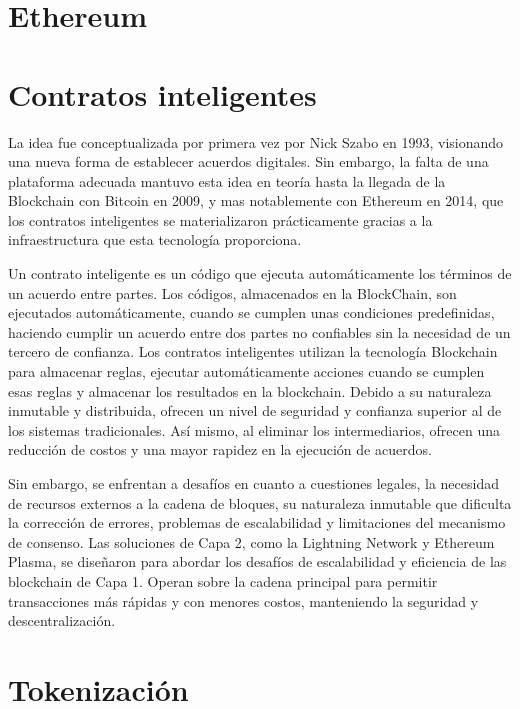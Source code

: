 \section{Ethereum}



\section{Contratos inteligentes}


La idea fue conceptualizada por primera vez por Nick Szabo en 1993, visionando una nueva forma de establecer acuerdos digitales. Sin embargo, la falta de una plataforma adecuada mantuvo esta idea en teoría hasta la llegada de la Blockchain con Bitcoin en 2009, y mas notablemente con Ethereum en 2014, que los contratos inteligentes se materializaron prácticamente gracias a la infraestructura que esta tecnología proporciona. ~\cite{smartcontractHistoria}

Un contrato inteligente es un código que ejecuta automáticamente los términos de un acuerdo entre partes. Los códigos, almacenados en la BlockChain, son ejecutados automáticamente, cuando se cumplen unas condiciones predefinidas, haciendo cumplir un acuerdo entre dos partes no confiables sin la necesidad de un tercero de confianza.
Los contratos inteligentes utilizan la tecnología Blockchain para almacenar reglas, ejecutar automáticamente acciones cuando se cumplen esas reglas y almacenar los resultados en la blockchain. Debido a su naturaleza inmutable y distribuida, ofrecen un nivel de seguridad y confianza superior al de los sistemas tradicionales. Así mismo, al eliminar los intermediarios, ofrecen una reducción de costos y una mayor rapidez en la ejecución de acuerdos.

Sin embargo, se enfrentan a desafíos en cuanto a cuestiones legales, la necesidad de recursos externos a la cadena de bloques, su naturaleza inmutable que dificulta la corrección de errores, problemas de escalabilidad y limitaciones del mecanismo de consenso. Las soluciones de Capa 2, como la Lightning Network y Ethereum Plasma, se diseñaron para abordar los desafíos de escalabilidad y eficiencia de las blockchain de Capa 1. Operan sobre la cadena principal para permitir transacciones más rápidas y con menores costos, manteniendo la seguridad y descentralización. ~\cite{AplicacionesDesafiosSmartcontract}



\section{Tokenización}

